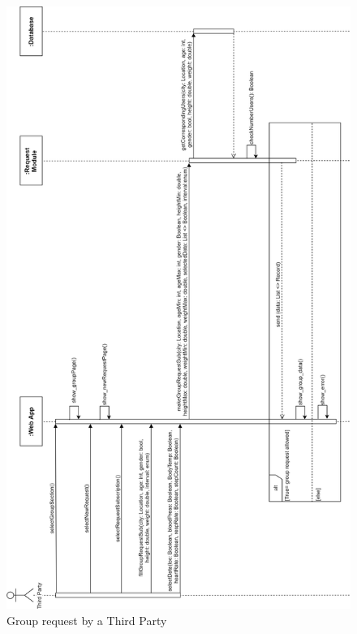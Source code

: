 \begin{figure}[H]
    \centering
    \includegraphics[scale=0.2]{./Pictures/groupRequestSeqDiagDDV.png}
    \caption{Group request by a Third Party}
\end{figure}

